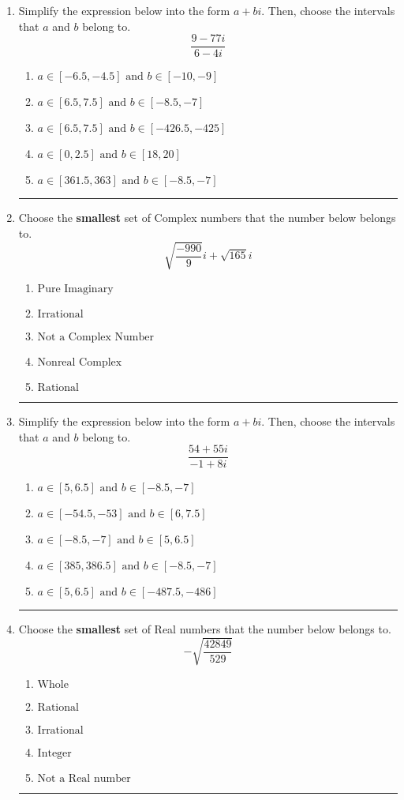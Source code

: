 \documentclass[14pt]{extbook}
\newcommand{\litem}[1]{\item#1\hspace*{-1cm}\rule{\textwidth}{0.4pt}}
\begin{document}
\begin{enumerate}
{\begin{enumerate}[label=\Alph*.]
\end{enumerate} }
\litem{
Simplify the expression below into the form $a+bi$. Then, choose the intervals that $a$ and $b$ belong to.\[ \frac{9 - 77 i}{6 - 4 i} \]\begin{enumerate}[label=\Alph*.]
\item \( a \in [-6.5, -4.5] \text{ and } b \in [-10, -9] \)
\item \( a \in [6.5, 7.5] \text{ and } b \in [-8.5, -7] \)
\item \( a \in [6.5, 7.5] \text{ and } b \in [-426.5, -425] \)
\item \( a \in [0, 2.5] \text{ and } b \in [18, 20] \)
\item \( a \in [361.5, 363] \text{ and } b \in [-8.5, -7] \)

\end{enumerate} }
\litem{
Choose the \textbf{smallest} set of Complex numbers that the number below belongs to.\[ \sqrt{\frac{-990}{9}} i+\sqrt{165}i \]\begin{enumerate}[label=\Alph*.]
\item \( \text{Pure Imaginary} \)
\item \( \text{Irrational} \)
\item \( \text{Not a Complex Number} \)
\item \( \text{Nonreal Complex} \)
\item \( \text{Rational} \)

\end{enumerate} }
\litem{
Simplify the expression below into the form $a+bi$. Then, choose the intervals that $a$ and $b$ belong to.\[ \frac{54 + 55 i}{-1 + 8 i} \]\begin{enumerate}[label=\Alph*.]
\item \( a \in [5, 6.5] \text{ and } b \in [-8.5, -7] \)
\item \( a \in [-54.5, -53] \text{ and } b \in [6, 7.5] \)
\item \( a \in [-8.5, -7] \text{ and } b \in [5, 6.5] \)
\item \( a \in [385, 386.5] \text{ and } b \in [-8.5, -7] \)
\item \( a \in [5, 6.5] \text{ and } b \in [-487.5, -486] \)

\end{enumerate} }
\litem{
Choose the \textbf{smallest} set of Real numbers that the number below belongs to.\[ -\sqrt{\frac{42849}{529}} \]\begin{enumerate}[label=\Alph*.]
\item \( \text{Whole} \)
\item \( \text{Rational} \)
\item \( \text{Irrational} \)
\item \( \text{Integer} \)
\item \( \text{Not a Real number} \)


\end{enumerate}}
\end{enumerate}
\end{document}
